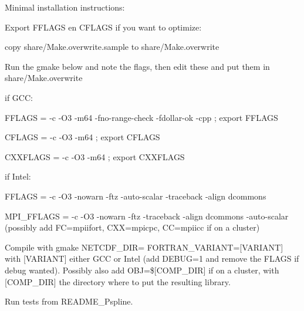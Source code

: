 \begin{DoxyItemize}
\begin{DoxyItemize}
\item Minimal installation instructions\+:
\begin{DoxyEnumerate}
\item Export {\ttfamily F\+F\+L\+A\+GS} en {\ttfamily C\+F\+L\+A\+GS} if you want to optimize\+:
\begin{DoxyItemize}
\item copy {\ttfamily share/\+Make.\+overwrite.\+sample} to {\ttfamily share/\+Make.\+overwrite}
\item Run the gmake below and note the flags, then edit these and put them in {\ttfamily share/\+Make.\+overwrite}
\item if G\+CC\+:
\begin{DoxyItemize}
\item {\ttfamily F\+F\+L\+A\+GS = -\/c -\/\+O3 -\/m64 -\/fno-\/range-\/check -\/fdollar-\/ok -\/cpp ; export F\+F\+L\+A\+GS}
\item {\ttfamily C\+F\+L\+A\+GS = -\/c -\/\+O3 -\/m64 ; export C\+F\+L\+A\+GS}
\item {\ttfamily C\+X\+X\+F\+L\+A\+GS = -\/c -\/\+O3 -\/m64 ; export C\+X\+X\+F\+L\+A\+GS}
\end{DoxyItemize}
\item if Intel\+:
\begin{DoxyItemize}
\item {\ttfamily F\+F\+L\+A\+GS = -\/c -\/\+O3 -\/nowarn -\/ftz -\/auto-\/scalar -\/traceback -\/align dcommons}
\item {\ttfamily M\+P\+I\+\_\+\+F\+F\+L\+A\+GS = -\/c -\/\+O3 -\/nowarn -\/ftz -\/traceback -\/align dcommons -\/auto-\/scalar} (possibly add FC=mpiifort, {\ttfamily C\+XX=mpicpc}, {\ttfamily CC=mpiicc} if on a cluster)
\end{DoxyItemize}
\end{DoxyItemize}
\item Compile with {\ttfamily gmake N\+E\+T\+C\+D\+F\+\_\+\+D\+IR= F\+O\+R\+T\+R\+A\+N\+\_\+\+V\+A\+R\+I\+A\+NT=\mbox{[}V\+A\+R\+I\+A\+NT\mbox{]}} with {\ttfamily \mbox{[}V\+A\+R\+I\+A\+NT\mbox{]}} either {\ttfamily G\+CC} or {\ttfamily Intel} (add {\ttfamily D\+E\+B\+UG=1} and remove the F\+L\+A\+GS if debug wanted). Possibly also add {\ttfamily O\+BJ=\$\mbox{[}C\+O\+M\+P\+\_\+\+D\+IR\mbox{]}} if on a cluster, with {\ttfamily \mbox{[}C\+O\+M\+P\+\_\+\+D\+IR\mbox{]}} the directory where to put the resulting library.
\item Run tests from {\ttfamily R\+E\+A\+D\+M\+E\+\_\+\+Pspline}.
\end{DoxyEnumerate}
\end{DoxyItemize}
\end{DoxyItemize}

